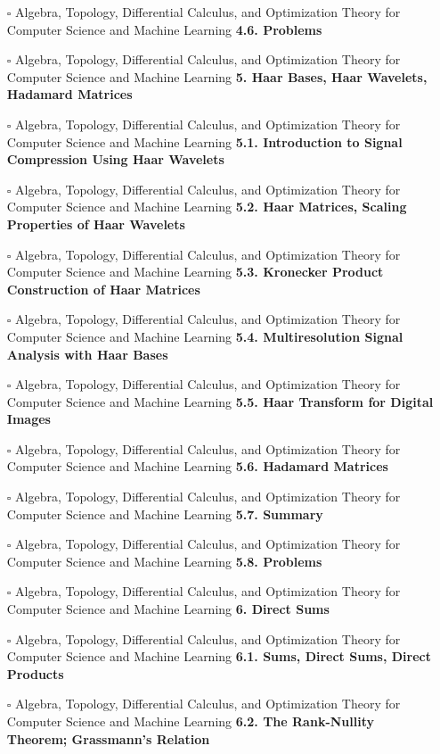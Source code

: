 \documentclass[a4, landscape, 12pt]{article}
\newcommand{\checkbox}{$\square$}%
\begin{document}
\begin{itemize}
{}
\item [\checkbox]  Algebra, Topology, Differential Calculus, and Optimization Theory for Computer Science and Machine Learning \textbf{ 4.6. Problems
}
\item [\checkbox]  Algebra, Topology, Differential Calculus, and Optimization Theory for Computer Science and Machine Learning \textbf{ 5. Haar Bases, Haar Wavelets, Hadamard Matrices
}
\item [\checkbox]  Algebra, Topology, Differential Calculus, and Optimization Theory for Computer Science and Machine Learning \textbf{ 5.1. Introduction to Signal Compression Using Haar Wavelets
}
\item [\checkbox]  Algebra, Topology, Differential Calculus, and Optimization Theory for Computer Science and Machine Learning \textbf{ 5.2. Haar Matrices, Scaling Properties of Haar Wavelets
}
\item [\checkbox]  Algebra, Topology, Differential Calculus, and Optimization Theory for Computer Science and Machine Learning \textbf{ 5.3. Kronecker Product Construction of Haar Matrices
}
\item [\checkbox]  Algebra, Topology, Differential Calculus, and Optimization Theory for Computer Science and Machine Learning \textbf{ 5.4. Multiresolution Signal Analysis with Haar Bases
}
\item [\checkbox]  Algebra, Topology, Differential Calculus, and Optimization Theory for Computer Science and Machine Learning \textbf{ 5.5. Haar Transform for Digital Images
}
\item [\checkbox]  Algebra, Topology, Differential Calculus, and Optimization Theory for Computer Science and Machine Learning \textbf{ 5.6. Hadamard Matrices
}
\item [\checkbox]  Algebra, Topology, Differential Calculus, and Optimization Theory for Computer Science and Machine Learning \textbf{ 5.7. Summary
}
\item [\checkbox]  Algebra, Topology, Differential Calculus, and Optimization Theory for Computer Science and Machine Learning \textbf{ 5.8. Problems
}
\item [\checkbox]  Algebra, Topology, Differential Calculus, and Optimization Theory for Computer Science and Machine Learning \textbf{ 6. Direct Sums
}
\item [\checkbox]  Algebra, Topology, Differential Calculus, and Optimization Theory for Computer Science and Machine Learning \textbf{ 6.1. Sums, Direct Sums, Direct Products
}
\item [\checkbox]  Algebra, Topology, Differential Calculus, and Optimization Theory for Computer Science and Machine Learning \textbf{ 6.2. The Rank-Nullity Theorem; Grassmann’s Relation
}
\end{itemize}
\end{document}

